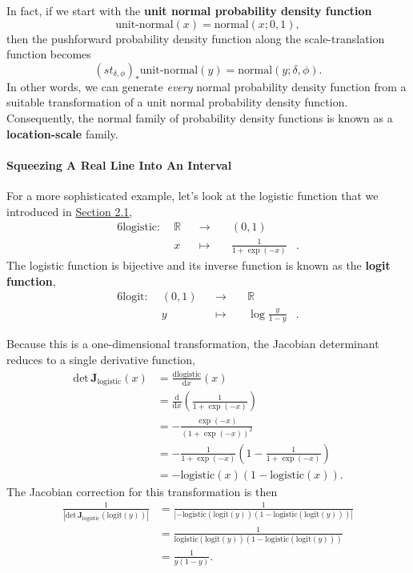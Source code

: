 \documentclass[
  letterpaper,
  DIV=11,
  numbers=noendperiod]{scrartcl}
\let\oldparagraph\paragraph
\renewcommand{\paragraph}[1]{\oldparagraph{#1}\mbox{}}
\begin{document}
In fact, if we start with the \textbf{unit normal probability density
function} \[
\text{unit-normal}(x) = \text{normal}(x; 0, 1),
\] then the pushforward probability density function along the
scale-translation function becomes \[
(st_{\delta, \phi})_{*} \text{unit-normal}(y)
=
\mathrm{normal}(y; \delta, \phi).
\] In other words, we can generate \emph{every} normal probability
density function from a suitable transformation of a unit normal
probability density function. Consequently, the normal family of
probability density functions is known as a \textbf{location-scale}
family.

\paragraph{Squeezing A Real Line Into An
Interval}\label{squeezing-a-real-line-into-an-interval}

For a more sophisticated example, let's look at the logistic function
that we introduced in \hyperref[sec:terminology]{Section 2.1},
\begin{alignat*}{6}
\text{logistic} :\; & \mathbb{R} & &\rightarrow& \; & (0, 1) &
\\
& x & &\mapsto& & \frac{1}{1 + \exp(-x)} &.
\end{alignat*} The logistic function is bijective and its inverse
function is known as the \textbf{logit function}, \begin{alignat*}{6}
\text{logit} :\; & (0, 1) & &\rightarrow& \; & \mathbb{R} &
\\
& y & &\mapsto& & \log \frac{y}{1 - y} &.
\end{alignat*}

Because this is a one-dimensional transformation, the Jacobian
determinant reduces to a single derivative function, \begin{align*}
\mathrm{det} \, \mathbf{J}_{\text{logistic}}(x)
&=
\frac{ \mathrm{d} \text{logistic} }{ \mathrm{d} x }(x)
\\
&=
\frac{ \mathrm{d} }{ \mathrm{d} x }
\left( \frac{1}{1 + \exp(-x)} \right)
\\
&=
- \frac{\exp(-x)}{(1 + \exp(-x))^{2}}
\\
&=
- \frac{1}{1 + \exp(-x)} \left(1 - \frac{1}{1 + \exp(-x)} \right)
\\
&=
- \text{logistic}(x) \left(1 - \text{logistic}(x) \right).
\end{align*} The Jacobian correction for this transformation is then
\begin{align*}
\frac{1}
{| \mathrm{det} \, \mathbf{J}_{\text{logistic}}(\text{logit}(y)) |}
&=
\frac{1}{ | - \text{logistic}(\text{logit}(y))
              \left(1 - \text{logistic}(\text{logit}(y)) \right) | }
\\
&=
\frac{1}{ \text{logistic}(\text{logit}(y))
          \left(1 - \text{logistic}(\text{logit}(y)) \right) }
\\
&=
\frac{1}{ y \left(1 - y \right) }.
\end{align*}
\end{document}
